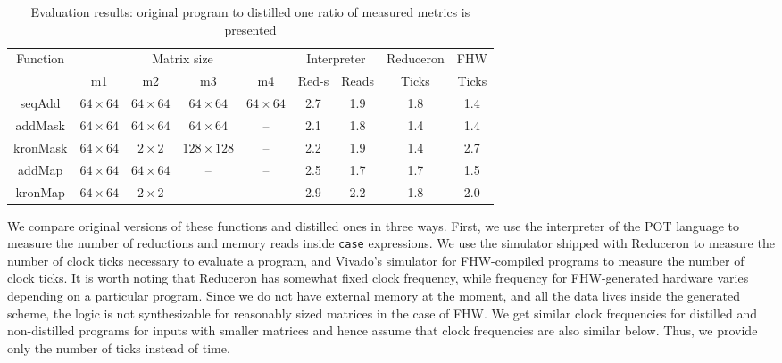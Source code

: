 \begin{table}
  \centering    
  \begin{tabular}{|c|c|c|c|c||c|c|c|c|}
      \hline
      \multirow{2}{*}{Function} &  \multicolumn{4}{c||}{Matrix size}  & \multicolumn{2}{c|}{Interpreter}            & Reduceron & FHW\\
      \cline{2-9}
                                &   m1 & m2 & m3 & m4                & Red-s & Reads                               & Ticks     & Ticks \\
      \hline
      seqAdd   & $64 \times 64$ & $64 \times 64$ & $64 \times 64$ & $64 \times 64$ & 2.7          & 1.9        & 1.8 & 1.4  \\ 
      addMask  & $64 \times 64$ & $64 \times 64$ & $64 \times 64$ & --             & 2.1          & 1.8        & 1.4 & 1.4  \\ 
      kronMask & $64 \times 64$ & $2 \times 2$   &$128 \times 128$& --             & 2.2          & 1.9        & 1.4 & 2.7  \\ 
      addMap   & $64 \times 64$ & $64 \times 64$ & --             & --             & 2.5          & 1.7        & 1.7 & 1.5  \\
      kronMap  & $64 \times 64$ & $2 \times 2$   & --             & --             & 2.9          & 2.2        & 1.8 & 2.0  \\ 
      \hline
      
  \end{tabular}
  \caption{Evaluation results: original program to distilled one ratio of measured metrics is presented}
  \label{tbl:evaluationResults}
\end{table}

We compare original versions of these functions and distilled ones in three ways.
First, we use the interpreter of the POT language to measure the number of reductions and memory reads inside \verb|case| expressions.
We use the simulator shipped with Reduceron to measure the number of clock ticks necessary to evaluate a program, and Vivado's simulator for FHW-compiled programs to measure the number of clock ticks.
It is worth noting that Reduceron has somewhat fixed clock frequency, while frequency for FHW-generated hardware varies depending on a particular program. 
Since we do not have external memory at the moment, and all the data lives inside the generated scheme, the logic is not synthesizable for reasonably sized matrices in the case of FHW.
We get similar clock frequencies for distilled and non-distilled programs for inputs with smaller matrices and hence assume that clock frequencies are also similar below. 
Thus, we provide only the number of ticks instead of time.

